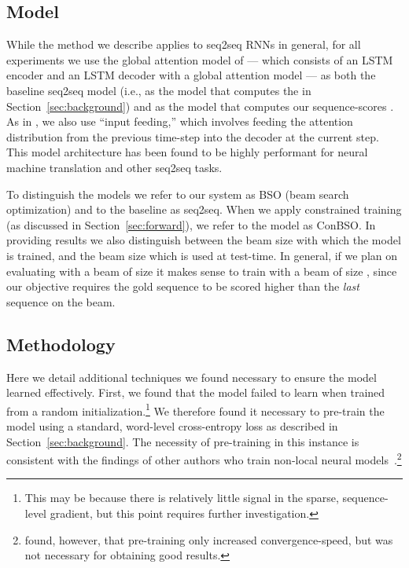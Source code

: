 \documentclass[11pt,letterpaper]{article}
\begin{document}
\subsection{Model}
While the method we describe applies to seq2seq RNNs in general,
for all experiments we use the global attention model of  ---
which consists of an LSTM~\cite{hochreiter1997lstm} encoder and an
LSTM decoder with a global attention model --- as both the baseline
seq2seq model (i.e., as the model that computes the  in
Section~\ref{sec:background}) and as the model that computes our
sequence-scores . As in , we also use
``input feeding,'' which involves feeding the attention distribution
from the previous time-step into the decoder at the current step. 
This model architecture has been found to be highly performant for neural
machine translation and other seq2seq tasks. 

To distinguish the models we refer to our system as BSO (beam search
optimization) and to the baseline as seq2seq. When we apply constrained training (as discussed in Section~\ref{sec:forward}), we refer to the model as ConBSO. In providing results we also distinguish between the
beam size  with which the model is trained, and the beam size
 which is used at test-time. In general, if we plan on
evaluating with a beam of size  it makes sense to train with a
beam of size , since our objective requires the
gold sequence to be scored higher than the \textit{last} sequence on
the beam.

\subsection{Methodology}
Here we detail additional techniques we found necessary to ensure the model learned effectively. First, we found that the model failed to learn when trained
from a random initialization.\footnote{This may be because there is relatively little signal in the sparse, sequence-level gradient, but this point requires further investigation.} We therefore found it necessary to pre-train the model using a standard,
word-level cross-entropy loss as described in
Section~\ref{sec:background}. The necessity of pre-training in this instance is consistent with the findings of other authors who train non-local neural models~\cite{kingsbury09lattice,sak14sequence,andor16globally,ranzato16sequence}.\footnote{ found, however, that pre-training only increased convergence-speed, but was not necessary for obtaining good results.}
\end{document}

